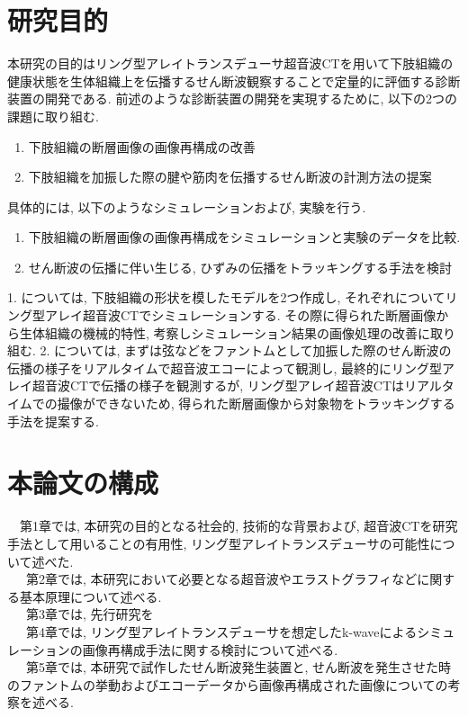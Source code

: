 \section{研究目的}
本研究の目的はリング型アレイトランスデューサ超音波CTを用いて下肢組織の健康状態を生体組織上を伝播するせん断波観察することで定量的に評価する診断装置の開発である. 前述のような診断装置の開発を実現するために, 以下の2つの課題に取り組む. 
\begin{enumerate}
   \item 下肢組織の断層画像の画像再構成の改善
   \item 下肢組織を加振した際の腱や筋肉を伝播するせん断波の計測方法の提案
\end{enumerate}
具体的には, 以下のようなシミュレーションおよび, 実験を行う.
\begin{enumerate}
   \item 下肢組織の断層画像の画像再構成をシミュレーションと実験のデータを比較.
   \item せん断波の伝播に伴い生じる, ひずみの伝播をトラッキングする手法を検討
\end{enumerate}
1. については, 下肢組織の形状を模したモデルを2つ作成し, それぞれについてリング型アレイ超音波CTでシミュレーションする. その際に得られた断層画像から生体組織の機械的特性, 考察しシミュレーション結果の画像処理の改善に取り組む. 2. については, まずは弦などをファントムとして加振した際のせん断波の伝播の様子をリアルタイムで超音波エコーによって観測し, 最終的にリング型アレイ超音波CTで伝播の様子を観測するが, リング型アレイ超音波CTはリアルタイムでの撮像ができないため, 得られた断層画像から対象物をトラッキングする手法を提案する. 

\section{本論文の構成}
　第1章では, 本研究の目的となる社会的, 技術的な背景および, 超音波CTを研究手法として用いることの有用性, リング型アレイトランスデューサの可能性について述べた.
\\\ \ \ 第2章では, 本研究において必要となる超音波やエラストグラフィなどに関する基本原理について述べる.
\\\ \ \ 第3章では, 先行研究を
\\\ \ \ 第4章では, リング型アレイトランスデューサを想定したk-waveによるシミュレーションの画像再構成手法に関する検討について述べる.
\\\ \ \ 第5章では, 本研究で試作したせん断波発生装置と, せん断波を発生させた時のファントムの挙動およびエコーデータから画像再構成された画像についての考察を述べる.







